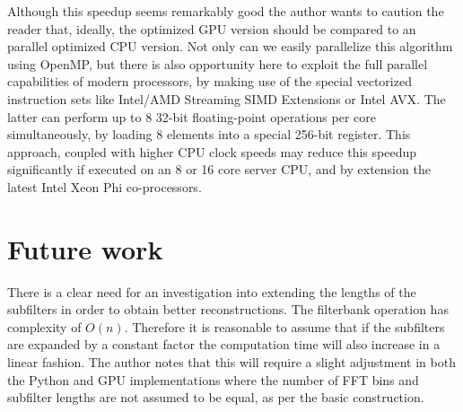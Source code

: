 \documentclass[a4paper,10pt]{article}
\begin{document}
Although this speedup seems remarkably good the author wants to caution the reader that, ideally, the optimized GPU version should be compared to an parallel optimized CPU
version. Not only can we easily parallelize this algorithm using OpenMP, but there is also opportunity here to exploit the full parallel capabilities of modern processors,
by making use of the special vectorized instruction sets like Intel/AMD Streaming SIMD Extensions or Intel AVX. The latter can perform up to 8 32-bit floating-point
operations per core simultaneously, by loading 8 elements into a special 256-bit register. This approach, coupled with higher CPU clock speeds may reduce this speedup 
significantly if executed on an 8 or 16 core server CPU, and by extension the latest Intel Xeon Phi co-processors.

\section{Future work}
There is a clear need for an investigation into extending the lengths of the subfilters in order to obtain better reconstructions. The filterbank operation has complexity of 
$O(n)$. Therefore it is reasonable to assume that if the subfilters are expanded by a constant factor the computation time will also increase in a linear fashion. The author 
notes that this will require a slight adjustment in both the Python and GPU implementations where the number of FFT bins and subfilter lengths are not assumed to be equal, 
as per the basic construction.
\pagebreak
{}

\end{document}
